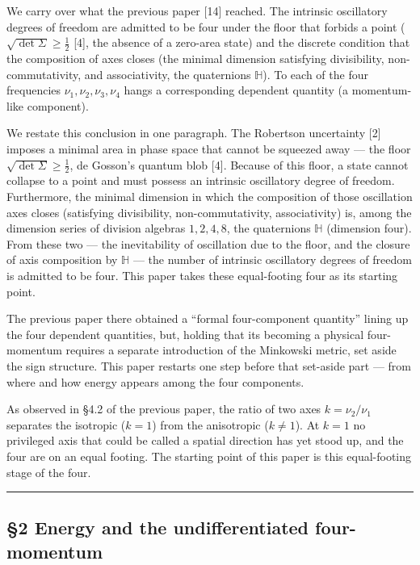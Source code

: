 \documentclass[
]{article}
\begin{document}
We carry over what the previous paper {[}14{]} reached. The intrinsic
oscillatory degrees of freedom are admitted to be four under the floor
that forbids a point (\(\sqrt{\det\Sigma}\ge\tfrac12\) {[}4{]}, the
absence of a zero-area state) and the discrete condition that the
composition of axes closes (the minimal dimension satisfying
divisibility, non-commutativity, and associativity, the quaternions
\(\mathbb{H}\)). To each of the four frequencies
\(\nu_1,\nu_2,\nu_3,\nu_4\) hangs a corresponding dependent quantity (a
momentum-like component).

We restate this conclusion in one paragraph. The Robertson uncertainty
{[}2{]} imposes a minimal area in phase space that cannot be squeezed
away --- the floor \(\sqrt{\det\Sigma}\ge\tfrac12\), de Gosson's quantum
blob {[}4{]}. Because of this floor, a state cannot collapse to a point
and must possess an intrinsic oscillatory degree of freedom.
Furthermore, the minimal dimension in which the composition of those
oscillation axes closes (satisfying divisibility, non-commutativity,
associativity) is, among the dimension series of division algebras
\(1,2,4,8\), the quaternions \(\mathbb{H}\) (dimension four). From these
two --- the inevitability of oscillation due to the floor, and the
closure of axis composition by \(\mathbb{H}\) --- the number of
intrinsic oscillatory degrees of freedom is admitted to be four. This
paper takes these equal-footing four as its starting point.

The previous paper there obtained a ``formal four-component quantity''
lining up the four dependent quantities, but, holding that its becoming
a physical four-momentum requires a separate introduction of the
Minkowski metric, set aside the sign structure. This paper restarts one
step before that set-aside part --- from where and how energy appears
among the four components.

As observed in §4.2 of the previous paper, the ratio of two axes
\(k=\nu_2/\nu_1\) separates the isotropic (\(k=1\)) from the anisotropic
(\(k\neq1\)). At \(k=1\) no privileged axis that could be called a
spatial direction has yet stood up, and the four are on an equal
footing. The starting point of this paper is this equal-footing stage of
the four.

\begin{center}\rule{0.5\linewidth}{0.5pt}\end{center}

\subsection{§2 Energy and the undifferentiated
four-momentum}\label{energy-and-the-undifferentiated-four-momentum}
\end{document}
